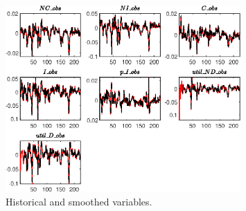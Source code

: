  
\begin{figure}[H]
\centering 
\includegraphics[width=0.80\textwidth]{BRS_sectoral_wo_demand_shocks/graphs/BRS_sectoral_wo_demand_shocks_HistoricalAndSmoothedVariables1}
\caption{Historical and smoothed variables.}\label{Fig:HistoricalAndSmoothedVariables:1}
\end{figure}


